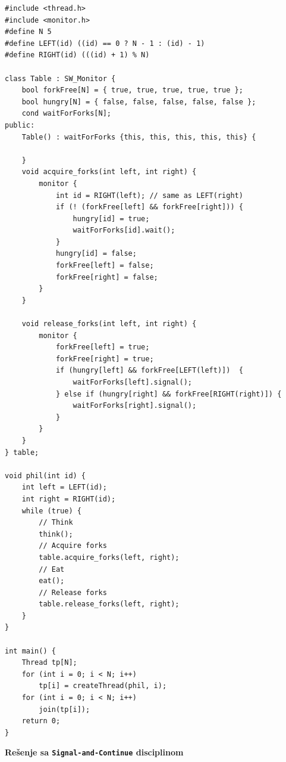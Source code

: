 \begin{lstlisting}
#include <thread.h>
#include <monitor.h>
#define N 5
#define LEFT(id) ((id) == 0 ? N - 1 : (id) - 1)
#define RIGHT(id) (((id) + 1) % N)

class Table : SW_Monitor {
    bool forkFree[N] = { true, true, true, true, true };
    bool hungry[N] = { false, false, false, false, false };
    cond waitForForks[N];
public:
    Table() : waitForForks {this, this, this, this, this} {
        
    }
    void acquire_forks(int left, int right) {
        monitor {
            int id = RIGHT(left); // same as LEFT(right)
            if (! (forkFree[left] && forkFree[right])) {
                hungry[id] = true;
                waitForForks[id].wait();
            }
            hungry[id] = false;
            forkFree[left] = false;
            forkFree[right] = false;
        }
    }

    void release_forks(int left, int right) {
        monitor {
            forkFree[left] = true;
            forkFree[right] = true;
            if (hungry[left] && forkFree[LEFT(left)])  {
                waitForForks[left].signal();
            } else if (hungry[right] && forkFree[RIGHT(right)]) {
                waitForForks[right].signal();
            }
        }
    }
} table;

void phil(int id) {
    int left = LEFT(id);
    int right = RIGHT(id);
    while (true) {
        // Think
        think();
        // Acquire forks
        table.acquire_forks(left, right);
        // Eat
        eat();
        // Release forks
        table.release_forks(left, right);
    }
}

int main() {
    Thread tp[N];
    for (int i = 0; i < N; i++) 
        tp[i] = createThread(phil, i);
    for (int i = 0; i < N; i++) 
        join(tp[i]);
    return 0;
}

\end{lstlisting}
\textbf{Re\v{s}enje sa \texttt{Signal-and-Continue} disciplinom}
